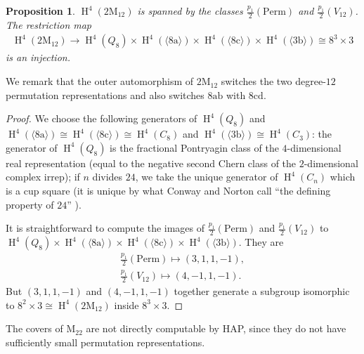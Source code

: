 \documentclass[pdftex]{sigma}
\numberwithin{equation}{section}
\newtheorem{Proposition}[Theorem]{Proposition}
 { \theoremstyle{definition}
\newtheorem{Remark}[Theorem]{Remark} }
\newcommand\ra{\mathrm a}
\newcommand\rb{\mathrm b}
\newcommand\rc{\mathrm c}
\newcommand\rd{\mathrm d}
\newcommand\rM{\mathrm M}
\DeclareMathOperator\homology{H}
\renewcommand\H{\homology}
\newcommand\<\langle
\renewcommand\>\rangle
\newcommand\Perm{\mathrm{Perm}}
\begin{document}
\begin{Proposition} $\H^4(2\rM_{12})$ is spanned by the classes $\frac{p_1}2(\Perm)$ and $\frac{p_1}2(V_{12})$. The restriction map \begin{gather*}\H^4(2\rM_{12}) \to \H^4(Q_8) \times \H^4(\langle 8\ra \rangle) \times \H^4(\langle 8\rc \rangle) \times \H^4(\langle 3\rb\rangle) \cong 8^3 \times 3\end{gather*} is an injection.
\end{Proposition}

We remark that the outer automorphism of $2\rM_{12}$ switches the two degree-$12$ permutation representations and also switches $8\ra\rb$ with $8\rc\rd$.

\begin{proof} We choose the following generators of $\H^4(Q_8)$ and $\H^4(\langle 8\ra\rangle) \cong \H^4(\langle 8\rc \rangle) \cong \H^4(C_8)$ and $\H^4(\langle 3\rb \rangle) \cong \H^4(C_3)$: the generator of $\H^4(Q_8)$ is the fractional Pontryagin class of the $4$-dimensional real representation (equal to the negative second Chern class of the $2$-dimensional complex irrep); if $n$ divides $24$, we take the unique generator of $\H^4(C_n)$ which is a cup square (it is unique by what Conway and Norton call ``the defining property of $24$'' \cite{MR554399}).

 It is straightforward to compute the images of $\frac{p_1}2(\Perm)$ and $\frac{p_1}2(V_{12})$ to $\H^4(Q_8) \times \H^4(\langle 8\ra \rangle) \times \H^4(\langle 8\rc \rangle) \times \H^4(\langle 3\rb\rangle)$. They are
 \begin{gather*}
 \tfrac{p_1}2(\Perm) \mapsto (3,1,1,-1), \\
 \tfrac{p_1}2(V_{12}) \mapsto (4,-1,1,-1).
 \end{gather*}
 But $(3,1,1,-1)$ and $(4,-1,1,-1)$ together generate a subgroup isomorphic to $8^2 \times 3 \cong \H^4(2\rM_{12})$ inside $8^3 \times 3$.
\end{proof}

The covers of $\rM_{22}$ are not directly computable by HAP, since they do not have sufficiently small permutation representations.
\end{document}
